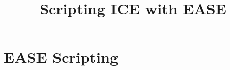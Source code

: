 \documentclass{report}
\begin{document}
\title{Scripting ICE with EASE}
\maketitle{}

\chapter{EASE Scripting}

\end{document}
